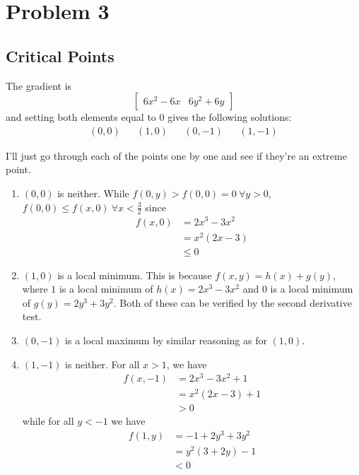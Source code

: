 \documentclass[12pt]{article}
\begin{document}
\pagebreak

\section{Problem 3}

\subsection{Critical Points}

The gradient is
\[\begin{bmatrix}
    6x^2-6x & 6y^2+6y
  \end{bmatrix}\]
and setting both elements equal to $0$ gives the following solutions:
\begin{align*}
  (0, 0) &  & (1, 0) &  & (0, -1) &  & (1, -1)
\end{align*}

I'll just go through each of the points one by one and see if they're an extreme point.
\begin{enumerate}
  \item $(0, 0)$ is neither.
        While $f(0, y) > f(0, 0) = 0\ \forall y > 0$,
        $f(0, 0) \le f(x, 0)\ \forall x < \frac{3}{2}$ since
        \begin{align*}
          f(x, 0)
           & = 2x^3-3x^2 \\
           & = x^2(2x-3) \\
           & \le 0
        \end{align*}
  \item $(1, 0)$ is a local minimum.
        This is because $f(x, y)=h(x)+g(y)$,
        where $1$ is a local minimum of $h(x)=2x^3-3x^2$
        and $0$ is a local minimum of $g(y)=2y^3+3y^2$.
        Both of these can be verified by the second derivative test.
  \item $(0, -1)$ is a local maximum by similar reasoning as for $(1, 0)$.
  \item $(1, -1)$ is neither.
        For all $x > 1$, we have
        \begin{align*}
          f(x, -1)
           & = 2x^3-3x^2+1 \\
           & = x^2(2x-3)+1 \\
           & > 0
        \end{align*}
        while for all $y < -1$ we have
        \begin{align*}
          f(1, y)
           & = -1+2y^3+3y^2 \\
           & = y^2(3+2y)-1  \\
           & < 0
        \end{align*}
\end{enumerate}
\end{document}
